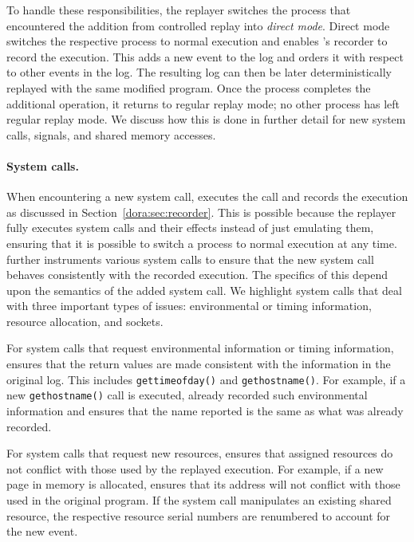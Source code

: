 To handle these responsibilities, the replayer switches the process
that encountered the addition from controlled replay into 
\emph{direct mode}.  Direct mode switches the respective process to  
normal execution  and enables {\dora}'s recorder to record the execution.
This adds a new event to the log and orders it
with respect to other events in the log.
The
resulting log can then be later deterministically replayed with the
same modified program.  Once the process completes the additional
operation, it returns to regular replay mode; no other process has
left regular replay mode.  We discuss how this is done in further detail
for new system calls, signals, and shared memory accesses. 

\paragraph{System calls.}
When encountering a new system call, {\dora} executes the
call and records the execution as discussed in Section~\ref{dora:sec:recorder}.
This is possible because the replayer fully executes system calls and
their effects instead of just emulating them, ensuring that it is
possible to switch a process to normal execution at any time.
{\dora} further instruments various system calls to ensure that the
new system call behaves consistently with the recorded execution.
The specifics of this depend upon the semantics of the added system
call. We highlight system calls that deal with three important types of issues:
environmental or timing information, resource allocation, and sockets.

For system calls that request environmental information or timing
information, {\dora} ensures that the return values are made
consistent with the information in the original log.  This includes
{\tt gettimeofday()} and {\tt gethostname()}.  For example, if a new
{\tt gethostname()} call is executed, {\dora} already recorded such
environmental information and ensures that the name reported is 
the same as what was already recorded.

For system calls that request new resources, {\dora} ensures that 
assigned resources do not conflict with those used by the replayed
execution.  For example, if a new page in memory is allocated,
{\dora} ensures that its address will not conflict with those used
in the original program.  If the system call manipulates an existing
shared resource, the respective resource serial numbers are renumbered
to account for the new event. 

